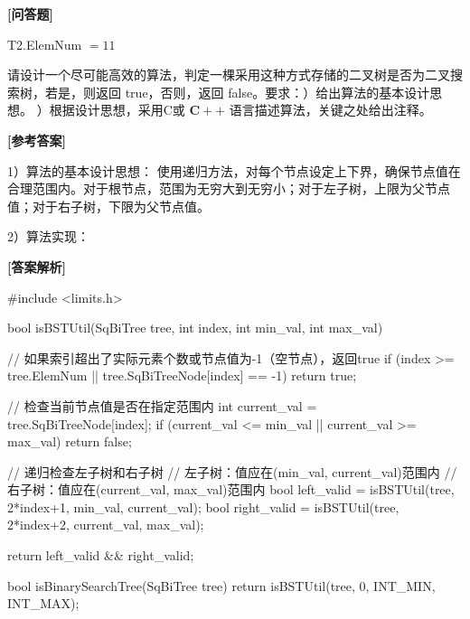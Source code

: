 \documentclass[12pt,a4paper]{article}
\newenvironment{choicequestion}[1][]{%
    \vspace{0.5cm}
    \noindent\textbf{[#1]}
    \vspace{0.2cm}
}{}
\newenvironment{answersection}{%
    \vspace{0.2cm}
    \noindent\textbf{[参考答案]}\\
    \vspace{0.1cm}
}{}
\newenvironment{analysissection}{%
    \vspace{0.2cm}
    \noindent\textbf{[答案解析]}\\
    \vspace{0.1cm}
}{}
\begin{document}
\begin{choicequestion}[问答题]
{T2.ElemNum $= 11$\newline

请设计一个尽可能高效的算法，判定一棵采用这种方式存储的二叉树是否为二叉搜索树，若是，则返回 true，否则，返回 false。要求：）给出算法的基本设计思想。  ）根据设计思想，采用C或 $\mathbf{C} + +$ 语言描述算法，关键之处给出注释。}{}

\begin{answersection}
1）算法的基本设计思想：
使用递归方法，对每个节点设定上下界，确保节点值在合理范围内。对于根节点，范围为无穷大到无穷小；对于左子树，上限为父节点值；对于右子树，下限为父节点值。

2）算法实现：
\end{answersection}

\begin{analysissection}
#include <limits.h>

bool isBSTUtil(SqBiTree tree, int index, int min_val, int max_val) {
    // 如果索引超出了实际元素个数或节点值为-1（空节点），返回true
    if (index >= tree.ElemNum || tree.SqBiTreeNode[index] == -1) {
        return true;
    }
    
    // 检查当前节点值是否在指定范围内
    int current_val = tree.SqBiTreeNode[index];
    if (current_val <= min_val || current_val >= max_val) {
        return false;
    }
    
    // 递归检查左子树和右子树
    // 左子树：值应在(min_val, current_val)范围内
    // 右子树：值应在(current_val, max_val)范围内
    bool left_valid = isBSTUtil(tree, 2*index+1, min_val, current_val);
    bool right_valid = isBSTUtil(tree, 2*index+2, current_val, max_val);
    
    return left_valid && right_valid;
}

bool isBinarySearchTree(SqBiTree tree) {
    return isBSTUtil(tree, 0, INT_MIN, INT_MAX);
}
\end{analysissection}
\end{choicequestion}
\end{document}

